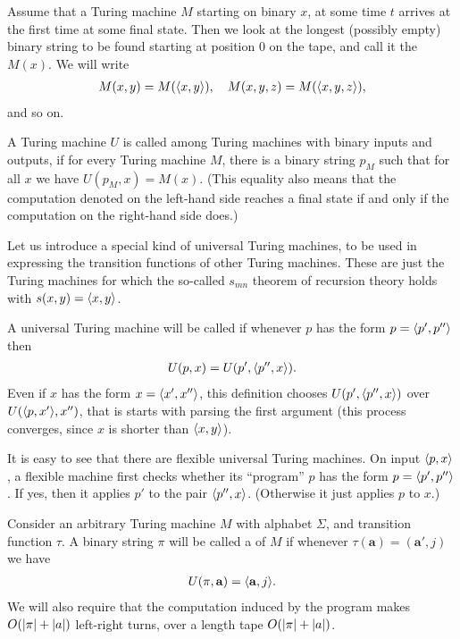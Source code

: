 \documentclass[11pt]{memoir}
\theoremstyle{definition} %
\renewcommand{\vek}[1]{\mathbf{#1}}
\newcommand{\va}{\vek{a}}
\begin{document}
\begin{definition}
 Assume that a Turing machine \( M \) starting on binary \( x \),
 at some time \( t \)
 arrives at the first time at some final state.
 Then we look at the longest (possibly empty)
 binary string to be found starting at position
 0 on the tape, and call it the  \( M(x) \).
We will write
 \begin{align*}
   M(x,y)=M({\mathopen\langle x,y\mathclose\rangle}),\quad M(x,y,z)=M({\mathopen\langle x,y,z\mathclose\rangle}),
 \end{align*}
and so on.

A Turing machine \( U \) is called  
among Turing machines with
binary inputs and outputs, if for every Turing machine \( M \),
there is a binary string \( p_{M} \) such that for all \( x \) we have
\( U(p_{M},x)=M(x) \).
(This equality also means that the computation denoted on the left-hand side 
reaches a final state if and only if the computation on the right-hand side does.)
\end{definition}

Let us introduce a special kind of universal Turing machines, to be
used in expressing the transition functions of other Turing machines.
These are just the Turing machines for which the so-called \( s_{mn} \) theorem
of recursion theory holds with \( s(x,y)={\mathopen\langle x,y\mathclose\rangle} \).

\begin{definition}\label{def:univ-TM}
A universal Turing machine will be called  if 
whenever \( p \) has the form \( p={\mathopen\langle p',p''\mathclose\rangle} \) then
\begin{align*}
 U(p,x)= U(p',{\mathopen\langle p'',x\mathclose\rangle}).
 \end{align*}
Even if \( x \) has the form \(x ={\mathopen\langle x',x''\mathclose\rangle} \), this definition chooses
\( U(p',{\mathopen\langle p'',x\mathclose\rangle}) \) over \( U({\mathopen\langle p,x'\mathclose\rangle},x'') \), that is starts with 
parsing the first argument
(this process converges, since \( x \) is  shorter than \( {\mathopen\langle x,y\mathclose\rangle} \)).
\end{definition}

It is easy to see that there are flexible universal Turing machines.
On input \( {\mathopen\langle p,x\mathclose\rangle} \),
a flexible machine first checks whether its ``program'' \( p \) 
has the form \( p={\mathopen\langle p',p''\mathclose\rangle} \).
If yes, then it applies \( p' \) to the pair \( {\mathopen\langle p'',x\mathclose\rangle} \).
(Otherwise it just applies \( p \) to \( x \).)

\begin{definition}
  Consider an arbitrary Turing machine \( M \) with alphabet
\( \Sigma \), and transition function \( \tau \).
A binary string \( \pi \) will be called a  of \( M \) if
whenever \( \tau(\va)=(\va',j) \) we have
 \begin{align*}
 U(\pi,\va)=\ang{\va,j}.
 \end{align*}
We will also require that the computation induced by the program makes
\( O(\lvert \pi \rvert+\lvert a \rvert) \) left-right turns, over a length tape \( O(\lvert \pi \rvert+\lvert a \rvert) \).
\end{definition}
\end{document}
